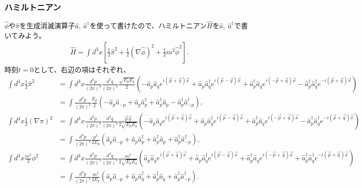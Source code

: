 \documentclass[10pt,a4paper]{jarticle}
\begin{document}
\subsubsection{ハミルトニアン}
$\hat\phi$や$\hat\pi$を生成消滅演算子$\hat a,~\hat a^\dagger$を使って書けたので、ハミルトニアン$\hat H$を$\hat a,~\hat a^\dagger$で書いてみよう。
\begin{align}
\hat H
= \int d^3x \left[ \frac{1}{2} \hat\pi^2 + \frac{1}{2}(\nabla\hat\phi)^2 + \frac{1}{2} m^2 \hat\phi^2 \right].
\end{align}
%
時刻$t=0$として、右辺の項はそれぞれ、
\begin{align}
\int d^3x \frac{1}{2}\hat \pi^2
&=
\int d^3 x \frac{d^3 p}{(2\pi)^3} \frac{d^3 q}{(2\pi)^3} \frac{ \sqrt{E_p E_q} }{2}\left(
	 -\hat a_p \hat a_q e^{i(\vec p + \vec q)\vec x}
	 +\hat a_p \hat a_q^\dagger  e^{i(\vec p - \vec q)\vec x}
 	 +\hat a_p^\dagger \hat a_q  e^{i(-\vec p + \vec q)\vec x}
 	 -\hat a_p^\dagger \hat a_q^\dagger e^{-i(\vec p + \vec q)\vec x}
	 \right) \nonumber\\
&=
\int \frac{d^3 p}{(2\pi)^3} \frac{E_p}{2}\left(
	 -\hat a_p \hat a_{-p}
	 +\hat a_p \hat a_p^\dagger
 	 +\hat a_p^\dagger \hat a_p
 	 -\hat a_p^\dagger \hat a_{-p}^\dagger
	 \right), \\
%
\int d^3x \frac{1}{2} (\nabla\pi)^2
&=
\int d^3 x \frac{d^3 p}{(2\pi)^3} \frac{d^3 q}{(2\pi)^3} \frac{\vec p \vec q}{2\sqrt{E_p E_q}}\left(
	 -\hat a_p \hat a_q e^{i(\vec p + \vec q)\vec x}
	 +\hat a_p \hat a_q^\dagger  e^{i(\vec p - \vec q)\vec x}
 	 +\hat a_p^\dagger \hat a_q  e^{i(-\vec p + \vec q)\vec x}
 	 -\hat a_p^\dagger \hat a_q^\dagger e^{-i(\vec p + \vec q)\vec x}
	 \right) \nonumber\\
&=
\int \frac{d^3 p}{(2\pi)^3} \frac{p^2}{2E_p}\left(
	 \hat a_p \hat a_{-p}
	 +\hat a_p \hat a_p^\dagger
 	 +\hat a_p^\dagger \hat a_p
 	 +\hat a_p^\dagger \hat a_{-p}^\dagger
	 \right), \\
%
\int d^3x \frac{m^2}{2}\phi^2
&=
\int d^3 x \frac{d^3 p}{(2\pi)^3} \frac{d^3 q}{(2\pi)^3} \frac{m^2}{2\sqrt{E_p E_q} }\left(
	 \hat a_p \hat a_q e^{i(\vec p + \vec q)\vec x}
	 +\hat a_p \hat a_q^\dagger  e^{i(\vec p - \vec q)\vec x}
 	 +\hat a_p^\dagger \hat a_q  e^{i(-\vec p + \vec q)\vec x}
 	 +\hat a_p^\dagger \hat a_q^\dagger e^{-i(\vec p + \vec q)\vec x}
	 \right) \nonumber\\
&=
\int \frac{d^3 p}{(2\pi)^3} \frac{m^2}{2E_p}\left(
	 \hat a_p \hat a_{-p}
	 +\hat a_p \hat a_q^\dagger
 	 +\hat a_p^\dagger \hat a_q
 	 +\hat a_p^\dagger \hat a_{-p}^\dagger
	 \right).
\end{align}
\end{document}
